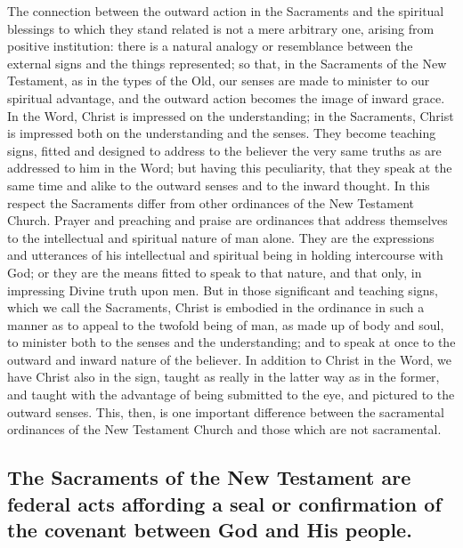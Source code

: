 \documentclass[]{book}
\begin{document}
The connection between the outward action in the Sacraments and the spiritual blessings to which they stand related is not a mere arbitrary one, arising from positive institution: there is a natural analogy or resemblance between the external signs and the things represented; so that, in the Sacraments of the New Testament, as in the types of the Old, our senses are made to minister to our spiritual advantage, and the outward action becomes the image of inward grace. In the Word, Christ is impressed on the understanding; in the Sacraments, Christ is impressed both on the understanding and the senses. They become teaching signs, fitted and designed to address to the believer the very same truths as are addressed to him in the Word; but having this peculiarity, that they speak at the same time and alike to the outward senses and to the inward thought. In this respect the Sacraments differ from other ordinances of the New Testament Church. Prayer and preaching and praise are ordinances that address themselves to the intellectual and spiritual nature of man alone. They are the expressions and utterances of his intellectual and spiritual being in holding intercourse with God; or they are the means fitted to speak to that nature, and that only, in impressing Divine truth upon men. But in those significant and teaching signs, which we call the Sacraments, Christ is embodied in the ordinance in such a manner as to appeal to the twofold being of man, as made up of body and soul, to minister both to the senses and the understanding; and to speak at once to the outward and inward nature of the believer. In addition to Christ in the Word, we have Christ also in the sign, taught as really in the latter way as in the former, and taught with the advantage of being submitted to the eye, and pictured to the outward senses. This, then, is one important difference between the sacramental ordinances of the New Testament Church and those which are not sacramental.

\hypertarget{the-sacraments-of-the-new-testament-are-federal-acts-affording-a-seal-or-confirmation-of-the-covenant-between-god-and-his-people.}{%
\subsection{The Sacraments of the New Testament are federal acts affording a seal or confirmation of the covenant between God and His people.}\label{the-sacraments-of-the-new-testament-are-federal-acts-affording-a-seal-or-confirmation-of-the-covenant-between-god-and-his-people.}}
\end{document}
